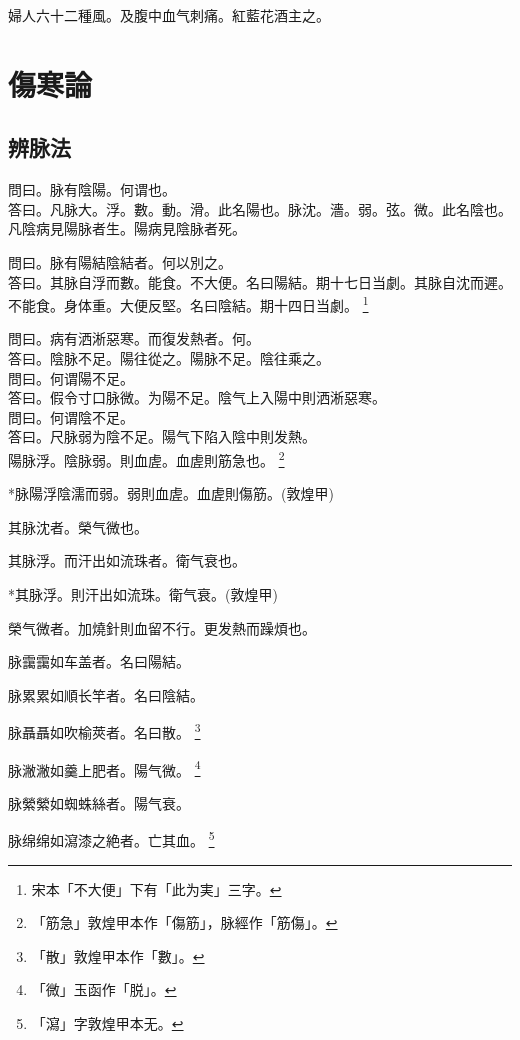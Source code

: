 \documentclass[b5paper,twoside,zihao=-4,UTF8]{ctexbook}
\begin{document}
婦人六十二種風。及腹中血气刺痛。紅藍花酒主之。

\part{傷寒論}

\chapter{辨脉法}

問曰。脉有陰陽。何谓也。\\
答曰。凡脉大。浮。數。動。滑。此名陽也。脉沈。濇。弱。弦。微。此名陰也。凡陰病見陽脉者生。陽病見陰脉者死。

問曰。脉有陽結陰結者。何以別之。\\
答曰。其脉{自}浮而數。能食。不大便。名曰陽結。期十七日当劇。其脉{自}沈而遲。不能食。身体重。大便反堅。名曰陰結。期十四日当劇。
	\footnote{宋本「不大便」下有「此为実」三字。}

問曰。病有洒淅惡寒。而復发熱者。何。\\
答曰。陰脉不足。陽往從之。陽脉不足。陰往乘之。\\
問曰。何谓陽不足。\\
答曰。假令寸口脉微。为陽不足。陰气上入陽中則洒淅惡寒。\\
問曰。何谓陰不足。\\
答曰。尺脉弱为陰不足。陽气下陷入陰中則发熱。\\

陽脉浮。陰脉弱。則血虗。血虗則筋急也。
	\footnote{「筋急」敦煌甲本作「傷筋」，脉經作「筋傷」。}

*脉陽浮陰濡而弱。弱則血虗。血虗則傷筋。(敦煌甲)

其脉沈者。榮气微也。

其脉浮。而汗出如流珠者。衛气衰也。

*其脉浮。則汗出如流珠。衛气衰。(敦煌甲)

榮气微者。加燒針則血留不行。更发熱而躁煩也。

脉靄靄如车盖者。名曰陽結。

脉累累如順长竿者。名曰陰結。

脉聶聶如吹榆莢者。名曰散。
	\footnote{「散」敦煌甲本作「數」。}

脉潎潎如羹上肥者。陽气微。
	\footnote{「微」玉函作「脱」。}

脉縈縈如蜘蛛絲者。陽气衰。

脉绵绵如{瀉}漆之絶者。亡其血。
	\footnote{「瀉」字敦煌甲本无。}
\end{document}
